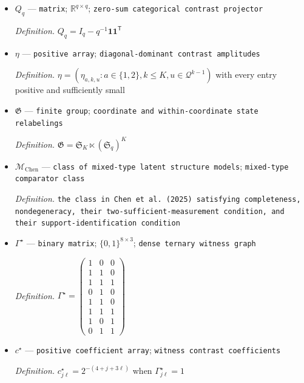 \documentclass{article}
\begin{document}
\begin{itemize}
  \par\smallskip\noindent\emph{Definition.} \texttt{the sign induced by the fixed lexicographic conventions}
  \item \(Q_q\) --- \texttt{matrix}; \(\mathbb R^{q\times q}\); \texttt{zero-\allowbreak{}sum categorical contrast projector}
  \par\smallskip\noindent\emph{Definition.} \(Q_q=I_q-q^{-1}\mathbf 1\mathbf 1^{\mathsf T}\)
  \item \(\eta\) --- \texttt{positive array}; \texttt{diagonal-\allowbreak{}dominant contrast amplitudes}
  \par\smallskip\noindent\emph{Definition.} \(\eta=(\eta_{a,k,u}:a\in\{1,2\},k\le K,u\in\mathcal Q^{k-1})\) with every entry positive and sufficiently small
  \item \(\mathfrak G\) --- \texttt{finite group}; \texttt{coordinate and within-\allowbreak{}coordinate state relabelings}
  \par\smallskip\noindent\emph{Definition.} \(\mathfrak G=\mathfrak S_K\ltimes(\mathfrak S_q)^K\)
  \item \(\mathcal M_{\mathrm{Chen}}\) --- \texttt{class of mixed-\allowbreak{}type latent structure models}; \texttt{mixed-\allowbreak{}type comparator class}
  \par\smallskip\noindent\emph{Definition.} \texttt{the class in Chen et al. (2025) satisfying completeness,\allowbreak{} nondegeneracy,\allowbreak{} their two-\allowbreak{}sufficient-\allowbreak{}measurement condition,\allowbreak{} and their support-\allowbreak{}identification condition}
  \item \(\Gamma^{\star}\) --- \texttt{binary matrix}; \(\{0,1\}^{8\times3}\); \texttt{dense ternary witness graph}
  \par\smallskip\noindent\emph{Definition.} \(\Gamma^{\star}=\begin{pmatrix}1&0&0\\1&1&0\\1&1&1\\0&1&0\\1&1&0\\1&1&1\\1&0&1\\0&1&1\end{pmatrix}\)
  \item \(c^{\star}\) --- \texttt{positive coefficient array}; \texttt{witness contrast coefficients}
  \par\smallskip\noindent\emph{Definition.} \(c^{\star}_{j\ell}=2^{-(4+j+3\ell)}\) when \(\Gamma^{\star}_{j\ell}=1\)

\end{itemize}
\end{document}
